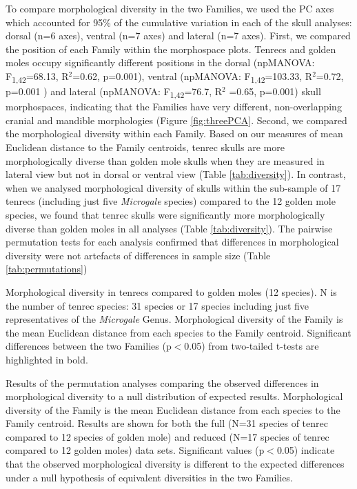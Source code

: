 \documentclass[12pt,a4paper]{article}
\begin{document}
	To compare morphological diversity in the two Families, we used the PC axes which accounted for 95\% of the cumulative variation in each of the skull analyses: dorsal (n=6 axes), ventral (n=7 axes) and lateral (n=7 axes). First, we compared the position of each Family within the morphospace plots. Tenrecs and golden moles occupy significantly different positions in the dorsal (npMANOVA: F\textsubscript{1,42}=68.13, R$^2$=0.62, p=0.001), ventral (npMANOVA: F\textsubscript{1,42}=103.33, R$^2$=0.72, p=0.001 ) and lateral (npMANOVA: F\textsubscript{1,42}=76.7, R$^2$ =0.65, p=0.001) skull morphospaces, indicating that the Families have very different, non-overlapping cranial and mandible morphologies (Figure \ref{fig:threePCA}. 
	Second, we compared the morphological diversity within each Family. Based on our measures of mean Euclidean distance to the Family centroids, tenrec skulls are more morphologically diverse than golden mole skulls when they are measured in lateral view but not in dorsal or ventral view (Table \ref{tab:diversity}). In contrast, when we analysed morphological diversity of skulls within the sub-sample of 17 tenrecs (including just five \textit{Microgale} species) compared to the 12 golden mole species, we found that tenrec skulls were significantly more morphologically diverse than golden moles in all analyses (Table \ref{tab:diversity}). The pairwise permutation tests for each analysis confirmed that differences in morphological diversity were not artefacts of differences in sample size (Table \ref{tab:permutations})

	\begin{table}[!htbp]			
		\caption[Comparing morphological diversity in tenrecs and golden moles.]
		{Morphological diversity in tenrecs compared to golden moles (12 species). N is the number of tenrec species: 31 species or 17 species including just five representatives of the \textit{Microgale} Genus. Morphological diversity of the Family is the mean Euclidean distance from each species to the Family centroid. Significant differences between the two Families (p$<$0.05) from two-tailed t-tests are highlighted in bold.}
		 
		\label{tab:diversity}  
	\end{table}
	
\begin{table}[!htbp]			
	\caption[Results of the permutation tests]{Results of the permutation analyses comparing the observed differences in morphological diversity to a null distribution of expected results. Morphological diversity of the Family is the mean Euclidean distance from each species to the Family centroid. Results are shown for both the full (N=31 species of tenrec compared to 12 species of golden mole) and reduced (N=17 species of tenrec compared to 12 golden moles) data sets. Significant values (p$<$0.05) indicate that the observed morphological diversity is different to the expected differences under a null hypothesis of equivalent diversities in the two Families.}
		 
		\label{tab:permutations}  
	\end{table}
\end{document}
